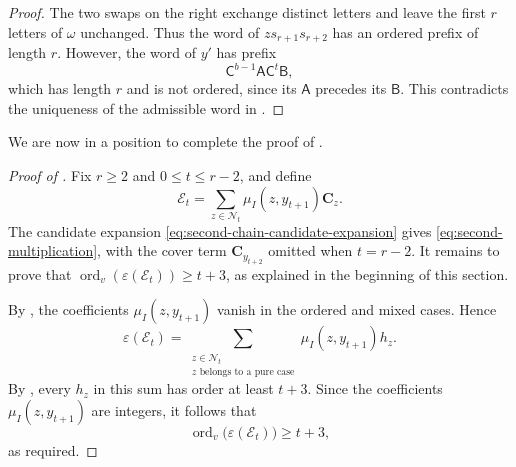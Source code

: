 \documentclass[11pt,a4paper,reqno]{amsart}
\numberwithin{equation}{section}
\theoremstyle{definition}
\theoremstyle{remark}
\theoremstyle{plain}
\newcommand{\C}{\mathbf C}
\newcommand{\eps}{\varepsilon}
\newcommand{\ord}{\operatorname{ord}_v}
\newcommand{\A}{\mathsf A}
\newcommand{\B}{\mathsf B}
\newcommand{\CC}{\mathsf C}
\newcommand{\mus}{\mu_I}
\begin{document}
\begin{proof}
The two swaps on the right exchange distinct letters and
leave the first $r$ letters of $\omega$ unchanged.
Thus the word of $zs_{r+1}s_{r+2}$ has an ordered prefix
of length $r$.
However, the word of $y'$ has prefix
\[
 \CC^{b-1}\A\CC^t\B,
\]
which has length $r$ and is not ordered, since its $\A$ precedes its $\B$.
This contradicts the uniqueness of the admissible word in .
\end{proof}

We are now in a position to complete the proof of .

\begin{proof}[Proof of ]
Fix $r\geq2$ and $0\leq t\leq r-2$, and define
\[
 \mathcal E_t=\sum_{z\in\mathcal N_t}
       \mus(z,y_{t+1})\C_z.
\]
The candidate expansion \eqref{eq:second-chain-candidate-expansion}
gives \eqref{eq:second-multiplication}, with the cover term
$\C_{y_{t+2}}$ omitted when $t=r-2$.
It remains to prove that $\ord(\eps(\mathcal E_t))\geq t+3$, as explained in the beginning of this section.

By , the coefficients $\mus(z,y_{t+1})$ vanish in the ordered and mixed cases.
Hence
\[
 \eps(\mathcal E_t)
 =\sum_{\substack{z\in\mathcal N_t\\
                  z\text{ belongs to a pure case}}}
       \mus(z,y_{t+1})h_z.
\]
By , every $h_z$ in this sum has order at least $t+3$. Since the coefficients $\mus(z,y_{t+1})$ are integers, it follows that
\[
 \ord\bigl(\eps(\mathcal E_t)\bigr)\geq t+3,
\]
as required.
\end{proof}


\end{document}

